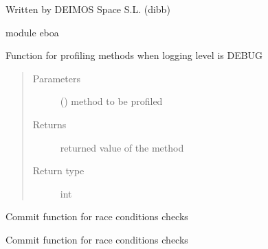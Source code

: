 Written by DEIMOS Space S.L. (dibb)

module eboa

\begin{fulllineitems}
\label{\detokenize{eboa:eboa.debugging.debug}}
Function for profiling methods when logging level is DEBUG
\begin{quote}\begin{description}
\item[{Parameters}] \leavevmode
{} () \textendash{} method to be profiled

\item[{Returns}] \leavevmode
returned value of the method

\item[{Return type}] \leavevmode
int

\end{description}\end{quote}

\end{fulllineitems}


\begin{fulllineitems}
\label{\detokenize{eboa:eboa.debugging.race_condition}}
Commit function for race conditions checks

\end{fulllineitems}


\begin{fulllineitems}
\label{\detokenize{eboa:eboa.debugging.race_condition2}}
Commit function for race conditions checks

\end{fulllineitems}



